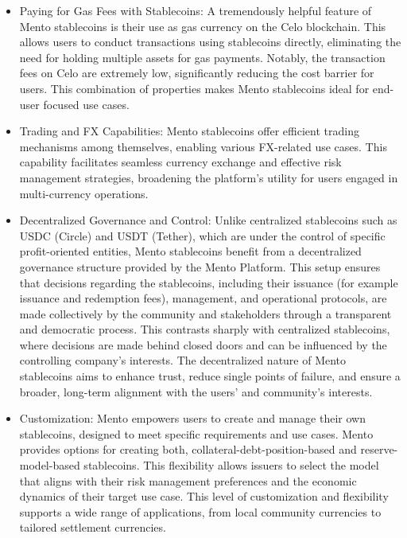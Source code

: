 \documentclass[a4paper]{article}
\theoremstyle{definition}
\begin{document}
\begin{itemize}
    \item Paying for Gas Fees with Stablecoins: A tremendously helpful feature of Mento stablecoins is their use as gas currency on the Celo blockchain. This allows users to conduct transactions using stablecoins directly, eliminating the need for holding multiple assets for gas payments. Notably, the transaction fees on Celo are extremely low, significantly reducing the cost barrier for users. This combination of properties makes Mento stablecoins ideal for end-user focused use cases.
    
    \item Trading and FX Capabilities: Mento stablecoins offer efficient trading mechanisms among themselves, enabling various FX-related use cases. This capability facilitates seamless currency exchange and effective risk management strategies, broadening the platform's utility for users engaged in multi-currency operations.
    
    \item Decentralized Governance and Control: Unlike centralized stablecoins such as USDC (Circle) and USDT (Tether), which are under the control of specific profit-oriented entities, Mento stablecoins benefit from a decentralized governance structure provided by the Mento Platform. This setup ensures that decisions regarding the stablecoins, including their issuance (for example issuance and redemption fees), management, and operational protocols, are made collectively by the community and stakeholders through a transparent and democratic process. This contrasts sharply with centralized stablecoins, where decisions are made behind closed doors and can be influenced by the controlling company's interests. The decentralized nature of Mento stablecoins aims to enhance trust, reduce single points of failure, and ensure a broader, long-term alignment with the users' and community's interests.
    
    \item Customization: Mento empowers users to create and manage their own stablecoins, designed to meet specific requirements and use cases. Mento provides options for creating both, collateral-debt-position-based and reserve-model-based stablecoins. This flexibility allows issuers to select the model that aligns with their risk management preferences and the economic dynamics of their target use case. This level of customization and flexibility supports a wide range of applications, from local community currencies to tailored settlement currencies.
    

\end{itemize}
\end{document}

